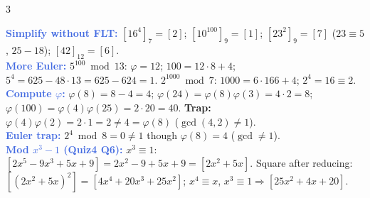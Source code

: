 \documentclass[9pt]{extarticle}
\newcommand{\hl}[1]{\textbf{\textcolor{BrickRed}{#1}}}
\newcommand{\ex}[1]{\textbf{\textcolor{RoyalBlue}{#1}}}
\begin{document}
\begin{multicols}{3}
\begin{sloppypar}
\ex{Simplify without FLT:} $[16^4]_7{=}[2]$; $[10^{100}]_9{=}[1]$; $[23^2]_9{=}[7]$ ($23\equiv5$, $25{-}18$); $[42]_{12}{=}[6]$.\\
\ex{More Euler:} $5^{100}\bmod13$: $\varphi{=}12$; $100{=}12{\cdot}8{+}4$; $5^4{=}625{-}48{\cdot}13{=}625{-}624{=}1$. $2^{1000}\bmod7$: $1000{=}6{\cdot}166{+}4$; $2^4{=}16\equiv2$.\\
\ex{Compute $\varphi$:} $\varphi(8){=}8{-}4{=}4$; $\varphi(24){=}\varphi(8)\varphi(3){=}4{\cdot}2{=}8$; $\varphi(100){=}\varphi(4)\varphi(25){=}2{\cdot}20{=}40$. \hl{Trap:} $\varphi(4)\varphi(2){=}2{\cdot}1{=}2{\ne}4{=}\varphi(8)$ ($\gcd(4,2){\ne}1$).\\
\ex{Euler trap:} $2^4\bmod8{=}0{\ne}1$ though $\varphi(8){=}4$ ($\gcd{\ne}1$).\\
\ex{Mod $x^3{-}1$ (Quiz4 Q6):} $x^3\equiv1$: $[2x^5{-}9x^3{+}5x{+}9]{=}2x^2{-}9{+}5x{+}9{=}[2x^2{+}5x]$. Square after reducing: $[(2x^2{+}5x)^2]{=}[4x^4{+}20x^3{+}25x^2]$; $x^4\equiv x$, $x^3\equiv1\Rightarrow[25x^2{+}4x{+}20]$.
\end{sloppypar}


\end{multicols}
\end{document}

